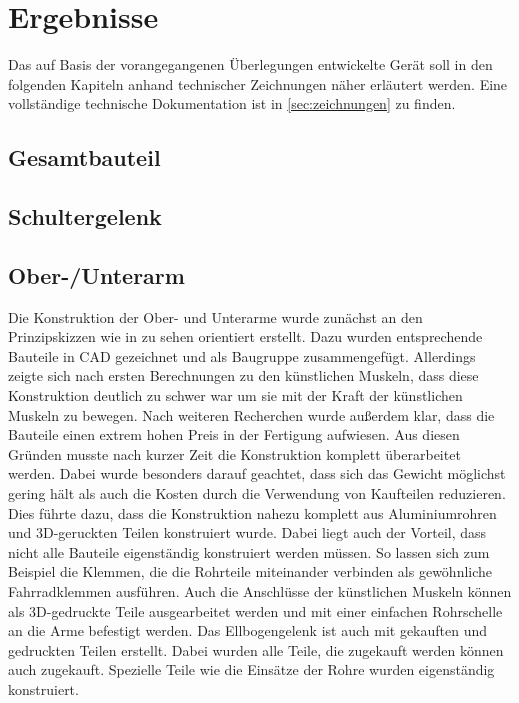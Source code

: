 \chapter{Ergebnisse}
	Das auf Basis der vorangegangenen Überlegungen entwickelte Gerät soll in den folgenden Kapiteln anhand technischer Zeichnungen näher erläutert werden.
	Eine vollständige technische Dokumentation ist in \cref{sec:zeichnungen} zu finden.
	\section{Gesamtbauteil}
	\section{Schultergelenk}
	\section{Ober-/Unterarm}
	Die Konstruktion der Ober- und Unterarme wurde zunächst an den Prinzipskizzen wie in  zu sehen orientiert erstellt.
	Dazu wurden entsprechende Bauteile in CAD gezeichnet und als Baugruppe zusammengefügt.
	Allerdings zeigte sich nach ersten Berechnungen zu den künstlichen Muskeln, dass diese Konstruktion deutlich zu schwer war um sie mit der Kraft der künstlichen Muskeln zu bewegen.
	Nach weiteren Recherchen wurde außerdem klar, dass die Bauteile einen extrem hohen Preis in der Fertigung aufwiesen.
	Aus diesen Gründen musste nach kurzer Zeit die Konstruktion komplett überarbeitet werden.
	Dabei wurde besonders darauf geachtet, dass sich das Gewicht möglichst gering hält als auch die Kosten durch die Verwendung von Kaufteilen reduzieren.
	Dies führte dazu, dass die Konstruktion nahezu komplett aus Aluminiumrohren und 3D-geruckten Teilen konstruiert wurde.
	Dabei liegt auch der Vorteil, dass nicht alle Bauteile eigenständig konstruiert werden müssen.
	So lassen sich zum Beispiel die Klemmen, die die Rohrteile miteinander verbinden als gewöhnliche Fahrradklemmen ausführen.
	Auch die Anschlüsse der künstlichen Muskeln können als 3D-gedruckte Teile ausgearbeitet werden und mit einer einfachen Rohrschelle an die Arme befestigt werden.
	Das Ellbogengelenk ist auch mit gekauften und gedruckten Teilen erstellt.
	Dabei wurden alle Teile, die zugekauft werden können auch zugekauft.
	Spezielle Teile wie die Einsätze der Rohre wurden eigenständig konstruiert. 
